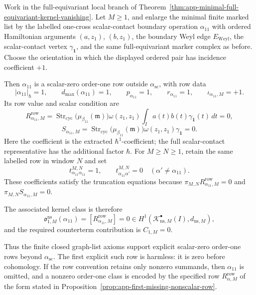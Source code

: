 \begin{prop}
\label{prop:app-first-scalar-zero-order-one-row}
  Work in the full-equivariant local branch of
  Theorem~\ref{thm:app-minimal-full-equivariant-kernel-vanishing}.  Let
  \(M\geq1\), and enlarge the minimal finite marked list by the labelled
  one-cross scalar-contact boundary operation
  \(\alpha_{11}\) with ordered Hamiltonian arguments
  \((a,z_1)\), \((b,z_1)\), the boundary Weyl edge \(E_{\mathrm{Weyl}}\),
  the scalar-contact vertex \(\gamma_{\mathbf 1}\), and the same
  full-equivariant marker complex as before.  Choose the orientation in
  which the displayed ordered pair has incidence coefficient \(+1\).

  Then \(\alpha_{11}\) is a scalar-zero order-one row outside
  \(\alpha_{\mathrm{sc}}\), with row data
  \[
    |\alpha_{11}|_\hbar=1,\qquad
    d_{\max}(\alpha_{11})=1,\qquad
    p_{\alpha_{11}}=1,\qquad
    r_{\alpha_{11}}=1,\qquad
    \iota_{\alpha_{11},M}=+1.
  \]
  Its row value and scalar condition are
  \[
    R^{\mathrm{row}}_{\alpha_{11},M}
      =
    \operatorname{Str}_{\mathrm{cyc}}
      \bigl(\mu_{\beta_{11}}(\mathfrak m)\bigr)
    \omega(z_1,z_1)
    \int_I a(t)b(t)\gamma_{\mathbf 1}(t)\,dt
      =0,
  \]
  \[
    S_{\alpha_{11},M}
      =
    \operatorname{Str}_{\mathrm{cyc}}
      \bigl(\mu_{\beta_{11}}(\mathfrak m)\bigr)
    \omega(z_1,z_1)\gamma_{\mathbf 1}=0.
  \]
  Here the coefficient is the extracted \(\hbar^1\)-coefficient; the full
  scalar-contact representative has the additional factor \(\hbar\).
  For \(M\geq N\geq1\), retain the same labelled row in window \(N\) and
  set
  \[
    t^{M,N}_{\alpha_{11}\alpha_{11}}=1,\qquad
    t^{M,N}_{\alpha_{11}\alpha'}=0
    \quad(\alpha'\neq\alpha_{11}).
  \]
  These coefficients satisfy the truncation equations because
  \(\pi_{M,N}R^{\mathrm{row}}_{\alpha_{11},M}=0\) and
  \(\pi_{M,N}S_{\alpha_{11},M}=0\).

  The associated kernel class is therefore
  \[
    \mathfrak o^{\mathrm{ns}}_{1,M}(\alpha_{11})
      =
    [R^{\mathrm{row}}_{\alpha_{11},M}]
      =
    0
    \in H^1\!\left(
      \mathcal K^\bullet_{\mathrm{ns},M}(I),d_{\mathrm{ns},M}
    \right),
  \]
  and the required counterterm contribution is \(C_{1,M}=0\).

  Thus the finite closed graph-list axioms support explicit scalar-zero
  order-one rows beyond
  \(\alpha_{\mathrm{sc}}\).  The first explicit such row is harmless:
  it is zero before cohomology.  If the row convention retains only
  nonzero summands, then \(\alpha_{11}\) is omitted, and a nonzero
  order-one class is encoded by the specified row
  \(R^{\mathrm{row}}_{\alpha,M}\) of the form stated in
  Proposition~\ref{prop:app-first-missing-nonscalar-row}.
\end{prop}

